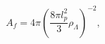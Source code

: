 \begin{equation}
A_{f}=4\pi \left( \frac{8\pi l_{p}^{2}}{3}\rho _{\Lambda }\right) ^{-2},
\end{equation}


